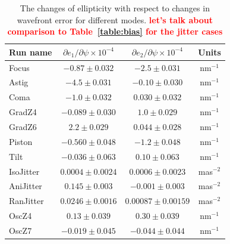 \documentclass[aps,prd, amsmath,amssymb,superscriptaddress,showkeys,nofootinbib,reprint,preprintnumbers]{revtex4-1}
\newcommand{\verify}[1]{\textcolor{red}{\textbf{{#1}}}}
\begin{document}
\begin{table}
\label{table:partials}
\caption{The changes of ellipticity with respect to changes in wavefront error for different modes. \verify{let's talk about comparison to Table~\ref{table:bias} for the jitter cases}}\label{dpsi}
\begin{center}
\begin{tabular}{ lccc }
\hline
\hline
Run name & $\partial e_1/\partial\psi \times 10^{-4}$ & $\partial e_2/\partial\psi \times 10^{-4}$ & Units \\
\hline
Focus           & $-0.87  \pm 0.032$   & $-2.5  \pm 0.031$ & nm$^{-1}$ \\
Astig           & $-4.5   \pm 0.031$   & $-0.10 \pm 0.030$  & nm$^{-1}$ \\
Coma            & $-1.0   \pm 0.032$   & $0.030 \pm 0.032$  & nm$^{-1}$ \\
GradZ4          & $-0.089 \pm 0.030$   & $1.0   \pm 0.029$  & nm$^{-1}$ \\
GradZ6          & $2.2    \pm 0.029$   & $0.044 \pm 0.028$  & nm$^{-1}$ \\
Piston 		    & $-0.560  \pm 0.048$  & $-1.2  \pm 0.048$  & nm$^{-1}$ \\
Tilt 			& $-0.036 \pm 0.063$   & $0.10  \pm 0.063$  & nm$^{-1}$ \\ \hline
IsoJitter 		& $  0.0004 \pm 0.0024$     & $0.0006  \pm 0.0023$ & mas$^{-2}$ \\
AniJitter 		& $0.145   \pm 0.003$  & $-0.001 \pm 0.003$ & mas$^{-2}$ \\
RanJitter 	    & $0.0246  \pm 0.0016$  & $0.00087  \pm 0.00159$ & mas$^{-2}$ \\ \hline
OscZ4 		    & $0.13   \pm 0.039$   & $0.30  \pm 0.039$  & nm$^{-1}$ \\
OscZ7 		    & $-0.019 \pm 0.045$   & $-0.044\pm 0.044$   & nm$^{-1}$ \\
\hline
\hline
\end{tabular}
\end{center}
\end{table}
\end{document}

